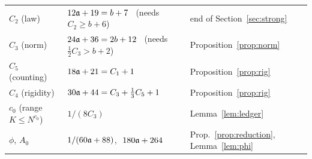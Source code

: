 \begin{center}
\begin{tabular}{|p{}|p{}|p{}|}
$C_2$ (law) & $12\mathfrak{a}+19=b+7$ \ (needs $C_2\ge b+6$) & end of Section~\ref{sec:strong}\\
$C_3$ (norm) & $24\mathfrak{a}+36=2b+12$ \ (needs $\frac12C_3>b+2$) & Proposition~\ref{prop:norm}\\
$C_5$ (counting) & $18\mathfrak{a}+21=C_1+1$ & Proposition~\ref{prop:rig}\\
$C_4$ (rigidity) & $30\mathfrak{a}+44=C_3+\frac13C_5+1$ & Proposition~\ref{prop:rig}\\
$c_0$ (range $K\le N^{c_0}$) & $1/(8C_3)$ & Lemma~\ref{lem:ledger}\\
$\phi$, $A_0$ & $1/(60\mathfrak{a}+88)$, $\ 180\fa+264$ & Prop.~\ref{prop:reduction}, Lemma~\ref{lem:phi}\\\hline
\end{tabular}
\end{center}


